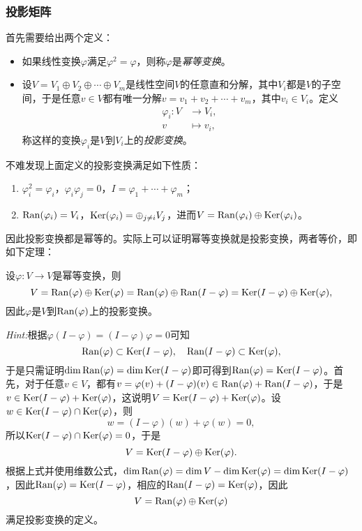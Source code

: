 \documentclass[a4paper,10pt]{ctexart}
\begin{document}
\subsubsection{投影矩阵}
首先需要给出两个定义：
\begin{itemize}
    \item 如果线性变换$ \varphi $满足$ \varphi^2=\varphi $，则称$ \varphi $是\emph{幂等变换}。
    \item 设$ V= V_1\oplus V_2\oplus \cdots \oplus V_m $是线性空间$ V $的任意直和分解，其中$ V_i $都是$ V $的子空间，于是任意$ v\in V $都有唯一分解$ v = v_1+v_2+\cdots +v_m $，其中$ v_i \in V_i $。定义
    \begin{equation}
        \begin{aligned}
            \varphi_i : V &\to V_i,\\
            v &\mapsto v_i,
        \end{aligned}
    \end{equation}
    称这样的变换$ \varphi_i $是$ V $到$ V_i $上的\emph{投影变换}。
\end{itemize}
不难发现上面定义的投影变换满足如下性质：
\begin{enumerate}
    \item $ \varphi_i^2 = \varphi_i $，$ \varphi_i \varphi_j = 0 $，$ I = \varphi_1 + \cdots +\varphi_m $；
    \item $ {\rm Ran}(\varphi_i) = V_i $，$ {\rm Ker}(\varphi_i)=\oplus_{j\ne i}V_j $，进而$ V={\rm Ran}(\varphi_i)\oplus {\rm Ker}(\varphi_i) $。
\end{enumerate}
因此投影变换都是幂等的。实际上可以证明幂等变换就是投影变换，两者等价，即如下定理：
\begin{theorem}
    设$ \varphi: V\to V $是幂等变换，则
    \begin{equation}
        V = {\rm Ran}(\varphi) \oplus {\rm Ker}(\varphi) = {\rm Ran}(\varphi) \oplus {\rm Ran}(I-\varphi) = {\rm Ker}(I-\varphi) \oplus {\rm Ker}(\varphi),
    \end{equation}
    因此$ \varphi $是$ V $到$ {\rm Ran}(\varphi) $上的投影变换。
\end{theorem}
\noindent \emph{Hint:}根据$ \varphi(I-\varphi) = (I-\varphi)\varphi = 0 $可知
\[
    {\rm Ran}(\varphi) \subset {\rm Ker}(I-\varphi),\quad {\rm Ran}(I-\varphi) \subset {\rm Ker}(\varphi),
\]
于是只需证明$ \dim {\rm Ran}(\varphi) = \dim {\rm Ker}(I-\varphi) $即可得到$ {\rm Ran}(\varphi) = {\rm Ker}(I-\varphi) $。首先，对于任意$ v\in V $，都有$ v = \varphi(v) + (I-\varphi)(v)\in {\rm Ran}(\varphi) + {\rm Ran}(I-\varphi) $，于是$ v\in {\rm Ker}(I-\varphi)+{\rm Ker}(\varphi) $，这说明$ V = {\rm Ker}(I-\varphi) + {\rm Ker}(\varphi) $。设$ w\in {\rm Ker}(I-\varphi)\cap {\rm Ker}(\varphi) $，则
\[
    w = (I-\varphi)(w) + \varphi(w) = 0,
\]
所以$ {\rm Ker}(I-\varphi)\cap {\rm Ker}(\varphi) = 0 $，于是
\[
    V = {\rm Ker}(I-\varphi)\oplus {\rm Ker}(\varphi).
\]
根据上式并使用维数公式，$ \dim {\rm Ran}(\varphi) = \dim V - \dim {\rm Ker}(\varphi) = \dim {\rm Ker}(I-\varphi) $，因此$ {\rm Ran}(\varphi) = {\rm Ker}(I-\varphi) $，相应的$ {\rm Ran}(I-\varphi) = {\rm Ker}(\varphi) $，因此
\[
    V = {\rm Ran}(\varphi) \oplus {\rm Ker}(\varphi)
\]
满足投影变换的定义。
\end{document}
